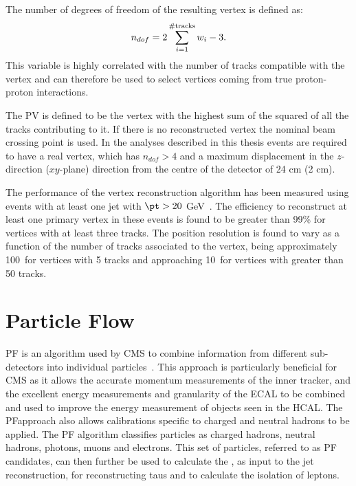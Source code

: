 The number of degrees of freedom of the resulting vertex is defined as:
\begin{equation}
  \label{eq:vertdof}
  n_{dof}=2\displaystyle\sum_{i=1}^{\# \rm{tracks}}w_i -3.
\end{equation}
This variable is highly correlated with the number of tracks compatible with the vertex and can therefore be used to select vertices coming from true proton-proton interactions.

The \ac{PV} is defined to be the vertex with the highest sum of the squared \pt of all the tracks contributing to it. If there is no reconstructed vertex the nominal beam crossing point is used. In the analyses described in this thesis events are required to have a real vertex, which has $n_{dof}>4$ and a maximum displacement in the $z$-direction ($xy$-plane) direction from the centre of the detector of 24 cm (2 cm).

The performance of the vertex reconstruction algorithm has been measured using events with at least one jet with $\pt>20$ GeV~\cite{1748-0221-9-10-P10009}. The efficiency to reconstruct at least one primary vertex in these events is found to be greater than 99\% for vertices with at least three tracks. The position resolution is found to vary as a function of the number of tracks associated to the vertex, being approximately 100\micron\, for vertices with 5 tracks and approaching 10\micron\, for vertices with greater than 50 tracks.

\section{Particle Flow}
\label{sec:pf}
\ac{PF} is an algorithm used by CMS to combine information from different sub-detectors into individual particles~\cite{CMS-PAS-PFT-09-001,CMS-PAS-PFT-10-001,CMS-PAS-PFT-10-002}. This approach is particularly beneficial for CMS as it allows the accurate momentum measurements of the inner tracker, and the excellent energy measurements and granularity of the \ac{ECAL} to be combined and used to improve the energy measurement of objects seen in the \ac{HCAL}. The \ac{PF}approach also allows calibrations specific to charged and neutral hadrons to be applied. The \ac{PF} algorithm classifies particles as charged hadrons, neutral hadrons, photons, muons and electrons. This set of particles, referred to as \ac{PF} candidates, can then further be used to calculate the \MET, as input to the jet reconstruction, for reconstructing taus and to calculate the isolation of leptons.

